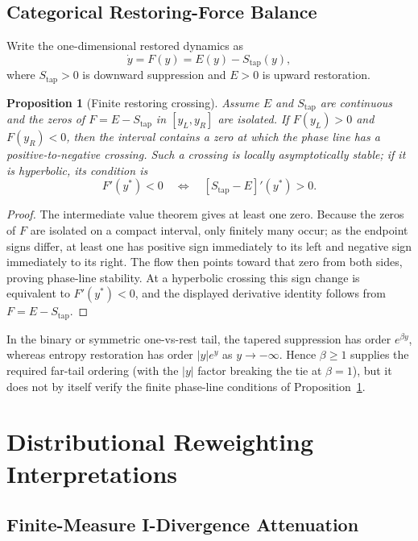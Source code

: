 \documentclass{article}
\theoremstyle{plain}
\newtheorem{proposition}[theorem]{Proposition}
\theoremstyle{definition}
\theoremstyle{remark}
\begin{document}
\subsection{Categorical Restoring-Force Balance}
\label{app:categorical_restoring_balance}

Write the one-dimensional restored dynamics as
\[
\dot y=F(y)=E(y)-S_{\mathrm{tap}}(y),
\]
where \(S_{\mathrm{tap}}>0\) is downward suppression and \(E>0\) is
upward restoration.

\begin{proposition}[Finite restoring crossing]
\label{prop:categorical_restoring_crossing}
Assume \(E\) and \(S_{\mathrm{tap}}\) are continuous and the zeros of
\(F=E-S_{\mathrm{tap}}\) in \([y_L,y_R]\) are isolated. If
\(F(y_L)>0\) and \(F(y_R)<0\), then the interval contains a zero at
which the phase line has a positive-to-negative crossing. Such a
crossing is locally asymptotically stable; if it is hyperbolic, its
condition is
\[
F'(y^*)<0
\quad\Longleftrightarrow\quad
[S_{\mathrm{tap}}-E]'(y^*)>0.
\]
\end{proposition}

\begin{proof}
The intermediate value theorem gives at least one zero. Because the
zeros of \(F\) are isolated on a compact interval, only finitely many occur; as
the endpoint signs differ, at least one has positive sign immediately
to its left and negative sign immediately to its right. The flow then
points toward that zero from both sides, proving phase-line stability. At a
hyperbolic crossing this sign change is equivalent to \(F'(y^*)<0\),
and the displayed derivative identity follows from \(F=E-S_{\mathrm{tap}}\).
\end{proof}

In the binary or symmetric one-vs-rest tail, the tapered suppression
has order \(e^{\beta y}\), whereas entropy restoration has order
\(|y|e^y\) as \(y\to-\infty\). Hence \(\beta\ge1\) supplies the
required far-tail ordering (with the \(|y|\) factor breaking the tie at
\(\beta=1\)), but it does not by itself verify the finite phase-line
conditions of Proposition~\ref{prop:categorical_restoring_crossing}.

\section{Distributional Reweighting Interpretations}
\label{app:distributional_reweighting}

\subsection{Finite-Measure I-Divergence Attenuation}
\label{app:finite_measure_variational}
\end{document}
